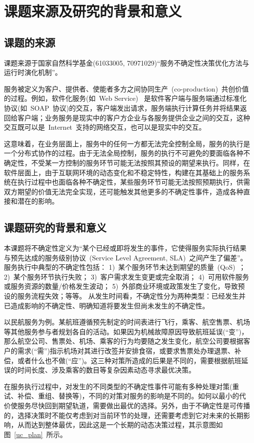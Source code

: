 \section{课题来源及研究的背景和意义}
\subsection{课题的来源}
课题来源于国家自然科学基金(61033005, 70971029)“服务不确定性决策优化方法与运行时演化机制”。

服务被定义为客户、提供者、使能者多方之间协同生产~(co-production)~共创价值的过程。例如，软件化服务(如~Web Service)~ 是软件客户端与服务端通过标准化协议(如~SOAP~协议)的交互，客户端发出请求，服务端执行计算任务并将结果返回给客户端；业务服务是现实中的客户方企业与各服务提供企业之间的交互，这种交互既可以是~Internet~支持的网络交互，也可以是现实中的交互。

这意味着，在业务层面上，服务中的任何一方都无法完全控制全局，服务的执行是一个分布式协作的过程。由于无法全局控制，服务的执行不可避免的要面临各种不确定性，不受某一方控制的服务环节可能无法按照其预设的期望来执行。同样，在软件层面上，由于互联网环境的动态变化和不稳定特性，构建在其基础上的服务系统在执行过程中也面临各种不确定性，某些服务环节可能无法按照预期执行，供需双方期望的价值无法完全实现，还可能触发其他更多的不确定性事件，造成各种直接和潜在的影响。

\subsection{课题研究的背景和意义}
本课题将不确定性定义为“某个已经或即将发生的事件，它使得服务实际执行结果与预先达成的服务级别协议~(Service Level Agreement, SLA)~之间产生了偏差”。服务执行中典型的不确定性包括：
1)~某个服务环节未达到期望的质量~(QoS)~；
2)~某个服务环节执行失败；
3)~客户需求发生变更或完全取消；
4)~可用软件服务或服务资源的数量/价格发生波动；
5)~外部商业环境或政策发生了变化，导致预设的服务流程失效；等等。
从发生时间看，不确定性分为两种类型：已经发生并已造成影响的不确定性、明确知道将要发生但尚未发生的不确定性。

以民航服务为例。某航班遵循预先制定的时间表进行飞行，乘客、航空售票、机场等其他服务参与者规划各自的活动。如果因为机械故障原因导致航班延误(“变”)，那么航空公司、售票处、机场、乘客的行为均要随之发生变化，航空公司要根据客户的需求(“需”)指示机场对其进行改签并安排食宿，或要求售票处办理退票、补偿，或者什么也不做(“应”)。这三种对策所造成的后果是不同的，需要根据航班延误的时间长度、涉及乘客的数目等复杂因素动态寻求最优决策。

在服务执行过程中，对发生的不同类型的不确定性事件可能有多种处理对策(重试、补偿、重组、替换等)，不同的对策对服务的影响是不同的。如何以最小的代价使服务尽快回到期望轨道，需要做出最优的选择。另外，由于不确定性是可传播的，选择决策时不能仅考虑到对当前环节的处理，还需要考虑到它对未来的长期影响，从而达到整体最优，因此这是一个长期的动态决策过程，其示意图如图~\ref{uc_plan}~所示。

